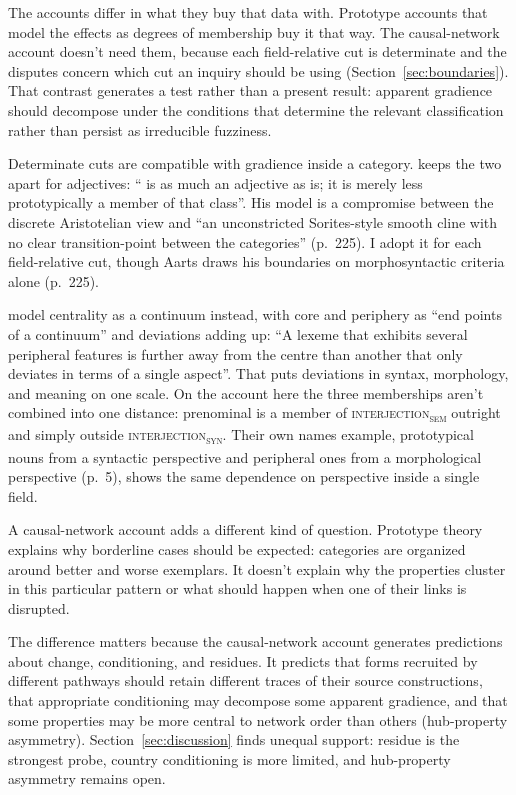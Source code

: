 \documentclass[12pt]{article}
\newcommand{\intj}[1]{\textsc{interjection\textsubscript{#1}}}
\begin{document}
The accounts differ in what they buy that data with. Prototype accounts that
model the effects as degrees of membership buy it that way. The causal-network account doesn't need them,
because each field-relative cut is determinate and the disputes concern which
cut an inquiry should be using (Section~\ref{sec:boundaries}). That contrast
generates a test rather than a present result: apparent gradience should
decompose under the conditions that determine the relevant classification
rather than persist as irreducible fuzziness.

Determinate cuts are compatible with gradience inside a category.
\textcite[206]{aarts2007} keeps the two apart for adjectives:
\enquote{ is as much an adjective as  is; it is
merely less prototypically a member of that class}. His model is a compromise
between the discrete Aristotelian view and \enquote{an unconstricted
Sorites-style smooth cline with no clear transition-point between the
categories} (p.~225). I adopt it for each field-relative cut, though Aarts
draws his boundaries on morphosyntactic criteria alone (p.~225).

\textcite[5]{zimmerackermann2025} model centrality as a continuum instead,
with core and periphery as \enquote{end points of a continuum} and
deviations adding up: \enquote{A lexeme that exhibits several peripheral
features is further away from the centre than another that only deviates in
terms of a single aspect}. That puts deviations in syntax, morphology, and
meaning on one scale. On the account here the three memberships aren't
combined into one distance: prenominal  is a member of
\intj{sem} outright and simply outside \intj{syn}. Their own names example,
prototypical nouns from a syntactic perspective and peripheral ones from a
morphological perspective (p.~5), shows the same dependence on perspective
inside a single field.

A causal-network account adds a different kind of question. Prototype
theory explains why borderline cases should be expected: categories are
organized around better and worse exemplars. It doesn't explain why
the properties cluster in this particular pattern or what should happen
when one of their links is disrupted.

The difference matters because the causal-network account generates
predictions about change, conditioning, and residues. It predicts that
forms recruited by different pathways should retain different traces of
their source constructions, that appropriate conditioning may decompose some
apparent gradience, and that some properties may be more central to network
order than others (hub-property asymmetry). Section~\ref{sec:discussion}
finds unequal support: residue is the strongest probe, country conditioning
is more limited, and hub-property asymmetry remains open.
\end{document}
